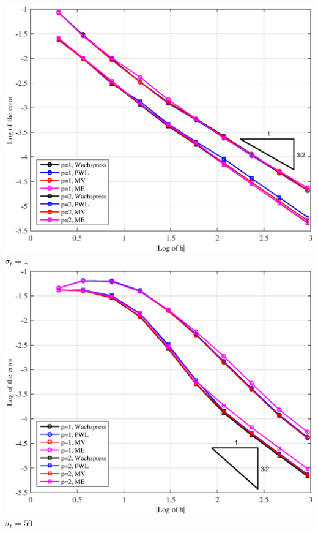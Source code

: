 \documentclass[compress,10pt]{beamer}
\begin{document}
\begin{frame}[t]
{\begin{columns}[c]
{}\includegraphics[width=\textwidth]{images/PAErr_LeftTop_Poly_sig1.eps} \\
$\sigma_t = 1$
\centering
{}\includegraphics[width=\textwidth]{images/PAErr_LeftTop_Poly_sig50.eps} \\
$\sigma_t = 50$
\end{columns}
}
\end{frame}

\typeout{***********************************************************************************}
\end{document}
